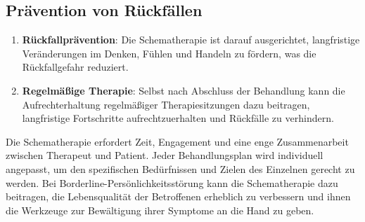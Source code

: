 \subsection{Prävention von Rückfällen}

\begin{enumerate}
\item \textbf{Rückfallprävention}: Die Schematherapie ist darauf ausgerichtet, langfristige Veränderungen im Denken, Fühlen und Handeln zu fördern, was die Rückfallgefahr reduziert.

\item \textbf{Regelmäßige Therapie}: Selbst nach Abschluss der Behandlung kann die Aufrechterhaltung regelmäßiger Therapiesitzungen dazu beitragen, langfristige Fortschritte aufrechtzuerhalten und Rückfälle zu verhindern.
\end{enumerate}
%
Die Schematherapie erfordert Zeit, Engagement und eine enge Zusammenarbeit zwischen Therapeut und Patient. Jeder Behandlungsplan wird individuell angepasst, um den spezifischen Bedürfnissen und Zielen des Einzelnen gerecht zu werden. Bei Borderline-Persönlichkeitsstörung kann die Schematherapie dazu beitragen, die Lebensqualität der Betroffenen erheblich zu verbessern und ihnen die Werkzeuge zur Bewältigung ihrer Symptome an die Hand zu geben.